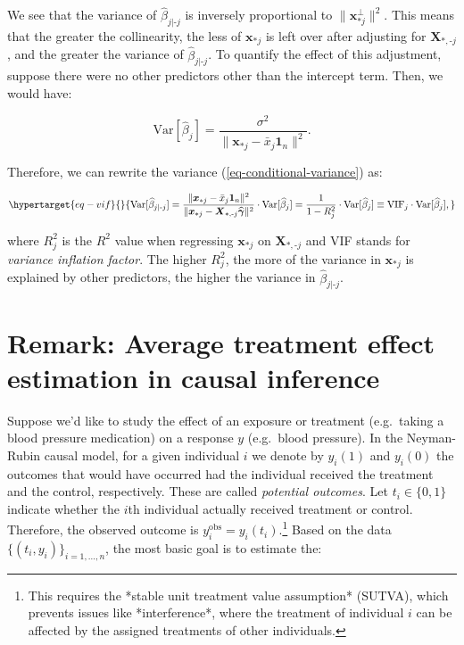 \documentclass[
  11pt,
  letterpaper,
  oneside]{book}
\theoremstyle{definition}
\theoremstyle{plain}
\theoremstyle{plain}
\theoremstyle{plain}
\theoremstyle{remark}
\begin{document}
We see that the variance of \(\widehat{\beta}_{j|\text{-}j}\) is
inversely proportional to \(\|\boldsymbol{x}_{*j}^\perp\|^2\). This
means that the greater the collinearity, the less of
\(\boldsymbol{x}_{*j}\) is left over after adjusting for
\(\boldsymbol{X}_{*,\text{-}j}\), and the greater the variance of
\(\widehat{\beta}_{j|\text{-}j}\). To quantify the effect of this
adjustment, suppose there were no other predictors other than the
intercept term. Then, we would have:

\[
\text{Var}[\widehat{\beta}_j] = \frac{\sigma^2}{\|\boldsymbol{x}_{*j}-\bar{x}_j \boldsymbol{1}_n\|^2}.
\]

Therefore, we can rewrite the variance (\ref{eq-conditional-variance})
as:

\begin{equation}\protect\hypertarget{eq-vif}{}{
\text{Var}[\widehat{\beta}_{j|\text{-}j}] = \frac{\|\boldsymbol{x}_{*j}-\bar{x}_j \boldsymbol{1}_n\|^2}{\|\boldsymbol{x}_{*j}-\boldsymbol{X}_{*,\text{-}j}\boldsymbol{\widehat{\gamma}}\|^2} \cdot \text{Var}[\widehat{\beta}_j] = \frac{1}{1-R_j^2} \cdot \text{Var}[\widehat{\beta}_j] \equiv \text{VIF}_j \cdot \text{Var}[\widehat{\beta}_j],
}\label{eq-vif}\end{equation}

where \(R_j^2\) is the \(R^2\) value when regressing
\(\boldsymbol{x}_{*j}\) on \(\boldsymbol{X}_{*,\text{-}j}\) and VIF
stands for \emph{variance inflation factor}. The higher \(R_j^2\), the
more of the variance in \(\boldsymbol{x}_{*j}\) is explained by other
predictors, the higher the variance in
\(\widehat{\beta}_{j|\text{-}j}\).

\hypertarget{remark-average-treatment-effect-estimation-in-causal-inference}{%
\section{Remark: Average treatment effect estimation in causal
inference}\label{remark-average-treatment-effect-estimation-in-causal-inference}}

Suppose we'd like to study the effect of an exposure or treatment
(e.g.~taking a blood pressure medication) on a response \(y\)
(e.g.~blood pressure). In the Neyman-Rubin causal model, for a given
individual \(i\) we denote by \(y_i(1)\) and \(y_i(0)\) the outcomes
that would have occurred had the individual received the treatment and
the control, respectively. These are called \emph{potential outcomes}.
Let \(t_i \in \{0,1\}\) indicate whether the \(i\)th individual actually
received treatment or control. Therefore, the observed outcome is
\(y_i^{\text{obs}} = y_i(t_i)\).\footnote{This requires the *stable unit treatment value assumption* (SUTVA), which prevents issues like *interference*, where the treatment of individual $i$ can be affected by the assigned treatments of other individuals.}
Based on the data \(\{(t_i, y_i)\}_{i = 1, \dots, n}\), the most basic
goal is to estimate the:
\end{document}
